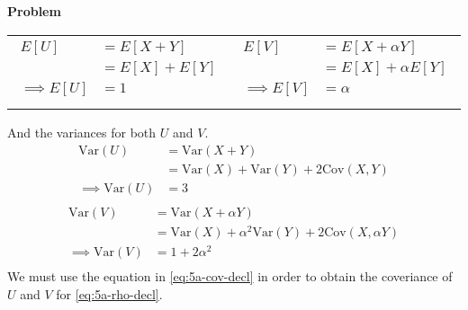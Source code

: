 \documentclass[12pt]{article}
\newenvironment{Ex}{\textbf{Problem}\vspace{.75em}\\}{}
\begin{document}
\begin{enumerate}
\begin{Ex}
\begin{solution}
\begin{enumerate}
\begin{tabularx}{.95\textwidth}{XX}
          \begin{equation}
            \label{eq:5a-e-u}
            \begin{aligned}
              E[U] &= E[X+Y] \\
              &= E[X] + E[Y] \\
              \implies E[U] &= 1 \\
            \end{aligned}
          \end{equation} &
          \begin{equation}
            \label{eq:5a-e-v}
            \begin{aligned}
              E[V] &= E[X + \alpha Y] \\
              &= E[X] + \alpha E[Y] \\
              \implies E[V] &= \alpha \\
            \end{aligned}
          \end{equation}
        \end{tabularx}
        And the variances for both $U$ and $V$.
        \begin{equation}
          \label{eq:5a-var-u}
          \begin{aligned}
            \text{Var}(U) &= \text{Var}(X+Y) \\
            &= \text{Var}(X) + \text{Var}(Y) + 2 \text{Cov}(X,Y) \\
            \implies \text{Var}(U) &= 3 \\
          \end{aligned}
        \end{equation}
        \begin{equation}
          \label{eq:5a-var-v}
          \begin{aligned}
            \text{Var}(V) &= \text{Var}(X + \alpha Y) \\
            &= \text{Var}(X) + \alpha^2 \text{Var}(Y) + 2
            \text{Cov}(X,\alpha Y) \\
            \implies \text{Var}(V) &= 1+2\alpha^2 \\
          \end{aligned}
        \end{equation}
        We must use the equation in \cref{eq:5a-cov-decl} in order to
        obtain the coveriance of $U$ and $V$ for \cref{eq:5a-rho-decl}.
        \begin{equation}
          \label{eq:5a-cov-aligned}
          \begin{aligned}

\end{aligned}
\end{equation}
\end{enumerate}
\end{solution}
\end{Ex}
\end{enumerate}
\end{document}
